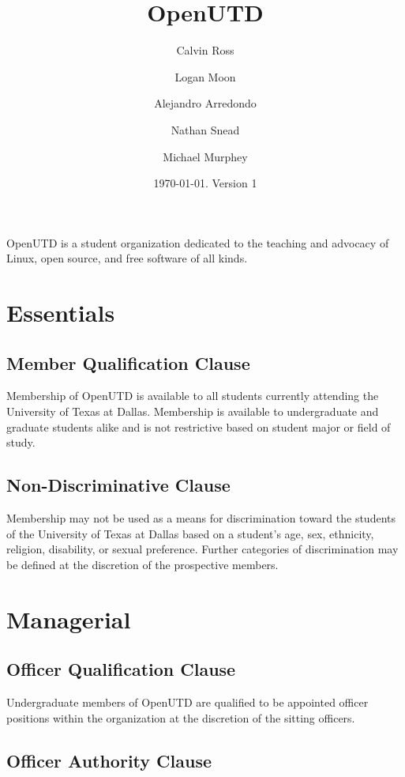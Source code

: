 \documentclass{constitution}
\title{OpenUTD}
\author{Calvin Ross \and Logan Moon \and Alejandro Arredondo \and Nathan Snead \and Michael Murphey}
\date{\today. Version 1}
\begin{document}
\maketitle
\begin{center}
  OpenUTD is a student organization dedicated to the teaching and advocacy of Linux, open source, and free software of all kinds.
\end{center}

\section{Essentials}

\subsection{Member Qualification Clause}

Membership of OpenUTD is available to all students currently attending the
University of Texas at Dallas. Membership is available to undergraduate and
graduate students alike and is not restrictive based on student major or field
of study.

\subsection{Non-Discriminative Clause}

Membership may not be used as a means for discrimination toward the students of
the University of Texas at Dallas based on a student's age, sex, ethnicity,
religion, disability, or sexual preference. Further categories of discrimination
may be defined at the discretion of the prospective members.

\section{Managerial}

\subsection{Officer Qualification Clause}

Undergraduate members of OpenUTD are qualified to be appointed officer positions
within the organization at the discretion of the sitting officers.

\subsection{Officer Authority Clause}
\end{document}
